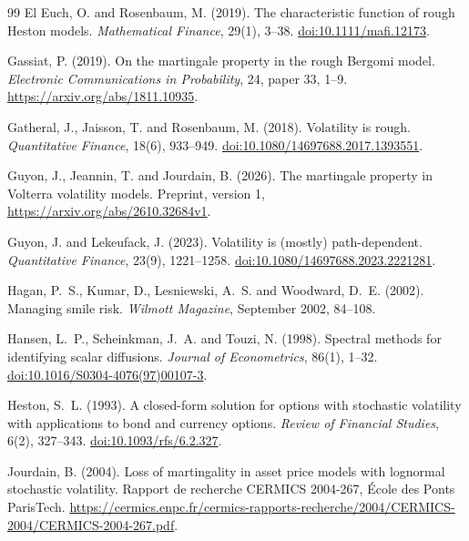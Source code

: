 \documentclass[11pt,a4paper]{article}
\theoremstyle{definition}
\theoremstyle{remark}
\begin{document}
\begin{thebibliography}{99}
El Euch, O. and Rosenbaum, M. (2019).
The characteristic function of rough Heston models.
\emph{Mathematical Finance}, 29(1), 3--38.
\href{https://doi.org/10.1111/mafi.12173}{doi:10.1111/mafi.12173}.

Gassiat, P. (2019).
On the martingale property in the rough Bergomi model.
\emph{Electronic Communications in Probability}, 24, paper 33, 1--9.
\url{https://arxiv.org/abs/1811.10935}.

Gatheral, J., Jaisson, T. and Rosenbaum, M. (2018).
Volatility is rough.
\emph{Quantitative Finance}, 18(6), 933--949.
\href{https://doi.org/10.1080/14697688.2017.1393551}{doi:10.1080/14697688.2017.1393551}.

Guyon, J., Jeannin, T. and Jourdain, B. (2026).
The martingale property in Volterra volatility models.
Preprint, version 1, \url{https://arxiv.org/abs/2610.32684v1}.

Guyon, J. and Lekeufack, J. (2023).
Volatility is (mostly) path-dependent.
\emph{Quantitative Finance}, 23(9), 1221--1258.
\href{https://doi.org/10.1080/14697688.2023.2221281}{doi:10.1080/14697688.2023.2221281}.

Hagan, P.~S., Kumar, D., Lesniewski, A.~S. and Woodward, D.~E. (2002).
Managing smile risk.
\emph{Wilmott Magazine}, September 2002, 84--108.

Hansen, L.~P., Scheinkman, J.~A. and Touzi, N. (1998).
Spectral methods for identifying scalar diffusions.
\emph{Journal of Econometrics}, 86(1), 1--32.
\href{https://doi.org/10.1016/S0304-4076(97)00107-3}{doi:10.1016/S0304-4076(97)00107-3}.

Heston, S.~L. (1993).
A closed-form solution for options with stochastic volatility with applications to bond and currency options.
\emph{Review of Financial Studies}, 6(2), 327--343.
\href{https://doi.org/10.1093/rfs/6.2.327}{doi:10.1093/rfs/6.2.327}.

Jourdain, B. (2004).
Loss of martingality in asset price models with lognormal stochastic volatility.
Rapport de recherche CERMICS 2004-267, \'Ecole des Ponts ParisTech.
\url{https://cermics.enpc.fr/cermics-rapports-recherche/2004/CERMICS-2004/CERMICS-2004-267.pdf}.


\end{thebibliography}
\end{document}
